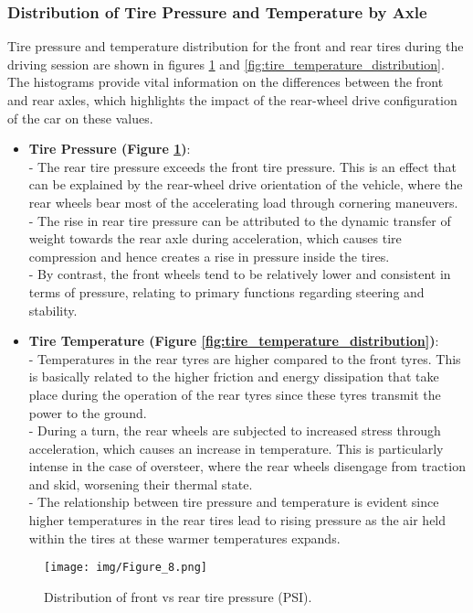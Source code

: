 \documentclass[a4paper,final,12pt]{report}
\begin{document}
\subsubsection{Distribution of Tire Pressure and Temperature by Axle}
Tire pressure and temperature distribution for the front and rear tires during the driving session are shown in figures \ref{fig:tire_pressure_distribution} and \ref{fig:tire_temperature_distribution}. The histograms provide vital information on the differences between the front and rear axles, which highlights the impact of the rear-wheel drive configuration of the car on these values.

\begin{itemize}
    \item \textbf{Tire Pressure (Figure \ref{fig:tire_pressure_distribution})}:\\
    - The rear tire pressure exceeds the front tire pressure. This is an effect that can be explained by the rear-wheel drive orientation of the vehicle, where the rear wheels bear most of the accelerating load through cornering maneuvers.\\
    - The rise in rear tire pressure can be attributed to the dynamic transfer of weight towards the rear axle during acceleration, which causes tire compression and hence creates a rise in pressure inside the tires.\\
    - By contrast, the front wheels tend to be relatively lower and consistent in terms of pressure, relating to primary functions regarding steering and stability.

    \item \textbf{Tire Temperature (Figure \ref{fig:tire_temperature_distribution})}:\\
    - Temperatures in the rear tyres are higher compared to the front tyres. This is basically related to the higher friction and energy dissipation that take place during the operation of the rear tyres since these tyres transmit the power to the ground.\\
    - During a turn, the rear wheels are subjected to increased stress through acceleration, which causes an increase in temperature. This is particularly intense in the case of oversteer, where the rear wheels disengage from traction and skid, worsening their thermal state.\\
    - The relationship between tire pressure and temperature is evident since higher temperatures in the rear tires lead to rising pressure as the air held within the tires at these warmer temperatures expands.
\end{itemize}
\begin{figure}[H]
    \centering
    \texttt{[image: img/Figure\_8.png]}
    \caption{Distribution of front vs rear tire pressure (PSI).}
    \label{fig:tire_pressure_distribution}
\end{figure}
\end{document}
